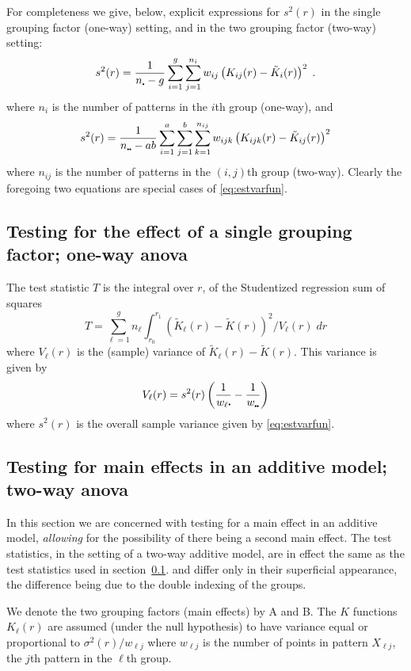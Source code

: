 \documentclass[12pt]{article}
\newcommand{\pullet}{\mbox{\scalebox{0.4}{$\bullet$}}}
\begin{document}
For completeness we give, below, explicit expressions for $s^2(r)$
in the single grouping factor (one-way) setting, and in the two
grouping factor (two-way) setting:
\[
s^2(r) = \frac{1}{n_{\pullet}-g} \sum_{i = 1}^g \sum_{j=1}^{n_i} w_{ij}
         \left (K_{ij}(r) - \tilde{K}_i(r) \right )^2 \; .
\]
where $n_i$ is the number of patterns in the $i$th group
(one-way), and
\[
s^2(r) = \frac{1}{n_{\pullet \pullet} - ab} \sum_{i = 1}^a \sum_{j=1}^b
         \sum_{k=1}^{n_{ij}} w_{ijk}
         \left (K_{ijk}(r) - \tilde{K}_{ij}(r) \right )^2
\]
where $n_{ij}$ is the number of patterns in the $(i,j)$th group
(two-way).  Clearly the foregoing two equations are special cases
of \eqref{eq:estvarfun}.

\subsection{Testing for the effect of a single grouping factor; one-way anova}
\label{sec:oneway}

The test statistic $T$ is the integral over $r$, of the Studentized
regression sum of squares
\[
T = \sum_{\ell=1}^g n_\ell \int_{r_0}^{r_1} (\tilde{K}_{\ell}(r) -
                 \tilde{K}(r))^2/V_{\ell}(r) \; dr
\]
where $V_{\ell}(r)$ is the (sample) variance of $\tilde{K}_{\ell}(r) - \tilde{K}(r)$.
This variance is given by
\[
V_{\ell}(r) = s^2(r) \left ( \frac{1}{w_\ell \pullet} - \frac{1}{w_{\pullet \pullet}} \right )
\]
where $s^2(r)$ is the overall sample variance given by \eqref{eq:estvarfun}.

\subsection{Testing for main effects in an additive model; two-way anova}
\label{sec:twoway}
In this section we are concerned with testing for a main effect in an
additive model, \emph{allowing} for the possibility of there being a
second main effect.  The test statistics, in the setting of a two-way
additive model, are in effect the same as the test statistics used
in section~\ref{sec:oneway}.  and differ only in their superficial
appearance, the difference being due to the double indexing of
the groups.

We denote the two grouping factors (main effects) by A and B.  The
$K$ functions $K_{\ell }(r)$ are assumed (under the null hypothesis)
to have variance equal or proportional to $\sigma^2(r)/w_{\ell j }$
where $w_{\ell j}$ is the number of points in pattern $X_{\ell j}$,
the $j$th pattern in the $\ell$th group.
\end{document}
